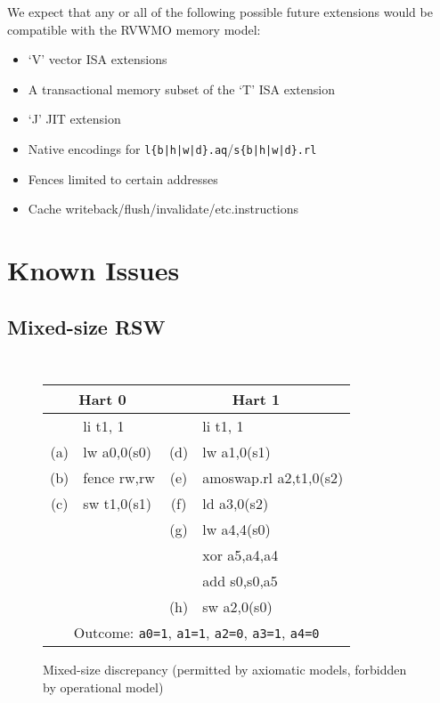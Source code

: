 We expect that any or all of the following possible future extensions would be compatible with the RVWMO memory model:

\begin{itemize}
  \item `V' vector ISA extensions
  \item A transactional memory subset of the `T' ISA extension
  \item `J' JIT extension
  \item Native encodings for {\tt l\{b|h|w|d\}.aq}/{\tt s\{b|h|w|d\}.rl}
  \item Fences limited to certain addresses
  \item Cache writeback/flush/invalidate/etc.\@ instructions
\end{itemize}

\section{Known Issues}
\label{sec:memory:discrepancies}

\subsection{Mixed-size RSW}
\label{sec:memory:discrepancies:mixedrsw}

\begin{figure}[h!]
  \centering\small
  {\tt
    \begin{tabular}{cl||cl}
    \multicolumn{2}{c}{Hart 0} & \multicolumn{2}{c}{Hart 1} \\
    \hline
          & li t1, 1    &     & li t1, 1    \\
      (a) & lw a0,0(s0) & (d) & lw a1,0(s1) \\
      (b) & fence rw,rw & (e) & amoswap.rl a2,t1,0(s2) \\
      (c) & sw t1,0(s1) & (f) & ld a3,0(s2) \\
          &             & (g) & lw a4,4(s0) \\
          &             &     & xor a5,a4,a4  \\
          &             &     & add s0,s0,a5  \\
          &             & (h) & sw a2,0(s0)   \\
      \hline
      \multicolumn{4}{c}{Outcome: {\tt a0=1}, {\tt a1=1}, {\tt a2=0}, {\tt a3=1}, {\tt a4=0}}
    \end{tabular}
  }
  \caption{Mixed-size discrepancy (permitted by axiomatic models, forbidden by operational model)}
  \label{fig:litmus:discrepancy:rsw1}
\end{figure}

